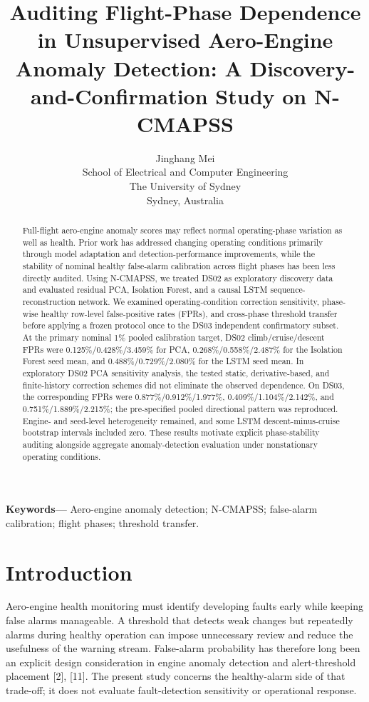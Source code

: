 \documentclass[10pt,twocolumn]{article}
\title{Auditing Flight-Phase Dependence in Unsupervised Aero-Engine Anomaly Detection: A Discovery-and-Confirmation Study on N-CMAPSS}
\author{Jinghang Mei\\School of Electrical and Computer Engineering\\The University of Sydney\\Sydney, Australia}
\date{}
\begin{document}
\maketitle
\begin{abstract}
Full-flight aero-engine anomaly scores may reflect normal operating-phase variation as well as health. Prior work has addressed changing operating conditions primarily through model adaptation and detection-performance improvements, while the stability of nominal healthy false-alarm calibration across flight phases has been less directly audited. Using N-CMAPSS, we treated DS02 as exploratory discovery data and evaluated residual PCA, Isolation Forest, and a causal LSTM sequence-reconstruction network. We examined operating-condition correction sensitivity, phase-wise healthy row-level false-positive rates (FPRs), and cross-phase threshold transfer before applying a frozen protocol once to the DS03 independent confirmatory subset. At the primary nominal 1\% pooled calibration target, DS02 climb/cruise/descent FPRs were 0.125\%/0.428\%/3.459\% for PCA, 0.268\%/0.558\%/2.487\% for the Isolation Forest seed mean, and 0.488\%/0.729\%/2.080\% for the LSTM seed mean. In exploratory DS02 PCA sensitivity analysis, the tested static, derivative-based, and finite-history correction schemes did not eliminate the observed dependence. On DS03, the corresponding FPRs were 0.877\%/0.912\%/1.977\%, 0.409\%/1.104\%/2.142\%, and 0.751\%/1.889\%/2.215\%; the pre-specified pooled directional pattern was reproduced. Engine- and seed-level heterogeneity remained, and some LSTM descent-minus-cruise bootstrap intervals included zero. These results motivate explicit phase-stability auditing alongside aggregate anomaly-detection evaluation under nonstationary operating conditions.
\end{abstract}
\par\smallskip\noindent\textbf{Keywords---} 
Aero-engine anomaly detection; N-CMAPSS; false-alarm calibration; flight phases; threshold transfer.


\section{Introduction}\label{introduction}

Aero-engine health monitoring must identify developing faults early while keeping false alarms manageable. A threshold that detects weak changes but repeatedly alarms during healthy operation can impose unnecessary review and reduce the usefulness of the warning stream. False-alarm probability has therefore long been an explicit design consideration in engine anomaly detection and alert-threshold placement {[}2{]}, {[}11{]}. The present study concerns the healthy-alarm side of that trade-off; it does not evaluate fault-detection sensitivity or operational response.
\end{document}
